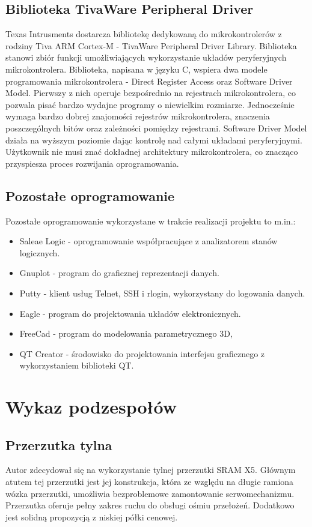 \subsection{Biblioteka TivaWare Peripheral Driver}
Texas Intrusments dostarcza bibliotekę dedykowaną do mikrokontrolerów z rodziny Tiva ARM Cortex-M - TivaWare  Peripheral Driver Library. Biblioteka stanowi zbiór funkcji umożliwiających wykorzystanie układów peryferyjnych mikrokontrolera. Biblioteka, napisana w języku C, wspiera dwa modele programowania mikrokontrolera - Direct Register Access oraz Software Driver Model. Pierwszy z nich operuje bezpośrednio na rejestrach mikrokontrolera, co pozwala pisać bardzo wydajne programy o niewielkim rozmiarze. Jednocześnie wymaga bardzo dobrej znajomości rejestrów mikrokontrolera, znaczenia poszczególnych bitów oraz zależności pomiędzy rejestrami. Software Driver Model działa na wyższym poziomie dając kontrolę nad całymi układami peryferyjnymi. Użytkownik nie musi znać dokładnej architektury mikrokontrolera, co znacząco przyspiesza proces rozwijania oprogramowania. 
\subsection{Pozostałe oprogramowanie}
Pozostałe oprogramowanie wykorzystane w trakcie realizacji projektu to m.in.:
\begin{itemize}
\item
Saleae Logic - oprogramowanie współpracujące z analizatorem stanów logicznych.
\item
Gnuplot - program do graficznej reprezentacji danych.
\item
Putty - klient usług Telnet, SSH i rlogin, wykorzystany do logowania danych.
\item
Eagle - program do projektowania układów elektronicznych.
\item
FreeCad - program do modelowania parametrycznego 3D,
\item
QT Creator - środowisko do projektowania interfejsu graficznego z wykorzystaniem biblioteki QT.
\end{itemize}
\section{Wykaz podzespołów}
\subsection{Przerzutka tylna}
Autor zdecydował się na wykorzystanie tylnej przerzutki SRAM X5. Głównym atutem tej przerzutki jest jej konstrukcja, która ze względu na długie ramiona wózka przerzutki, umożliwia bezproblemowe zamontowanie serwomechanizmu. Przerzutka oferuje pełny zakres ruchu do obsługi ośmiu przełożeń. Dodatkowo jest solidną propozycją z niskiej półki cenowej.
